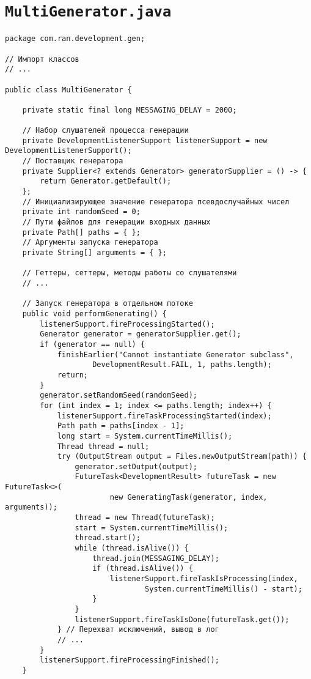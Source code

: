\section*{\texttt{MultiGenerator.java}}
\begin{verbatim}
package com.ran.development.gen;

// Импорт классов
// ...

public class MultiGenerator {
    
    private static final long MESSAGING_DELAY = 2000;
    
    // Набор слушателей процесса генерации
    private DevelopmentListenerSupport listenerSupport = new DevelopmentListenerSupport();
    // Поставщик генератора
    private Supplier<? extends Generator> generatorSupplier = () -> {
        return Generator.getDefault();
    };
    // Инициализирующее значение генератора псевдослучайных чисел
    private int randomSeed = 0;
    // Пути файлов для генерации входных данных
    private Path[] paths = { };
    // Аргументы запуска генератора
    private String[] arguments = { };
    
    // Геттеры, сеттеры, методы работы со слушателями
    // ...
    
    // Запуск генератора в отдельном потоке
    public void performGenerating() {
        listenerSupport.fireProcessingStarted();
        Generator generator = generatorSupplier.get();
        if (generator == null) {
            finishEarlier("Cannot instantiate Generator subclass",
                    DevelopmentResult.FAIL, 1, paths.length);
            return;
        }
        generator.setRandomSeed(randomSeed);
        for (int index = 1; index <= paths.length; index++) {
            listenerSupport.fireTaskProcessingStarted(index);
            Path path = paths[index - 1];
            long start = System.currentTimeMillis();
            Thread thread = null;
            try (OutputStream output = Files.newOutputStream(path)) {
                generator.setOutput(output);
                FutureTask<DevelopmentResult> futureTask = new FutureTask<>(
                        new GeneratingTask(generator, index, arguments));
                thread = new Thread(futureTask);
                start = System.currentTimeMillis();
                thread.start();
                while (thread.isAlive()) {
                    thread.join(MESSAGING_DELAY);
                    if (thread.isAlive()) {
                        listenerSupport.fireTaskIsProcessing(index,
                                System.currentTimeMillis() - start);
                    }
                }
                listenerSupport.fireTaskIsDone(futureTask.get());
            } // Перехват исключений, вывод в лог
            // ...
        }
        listenerSupport.fireProcessingFinished();
    }
    

\end{verbatim}

